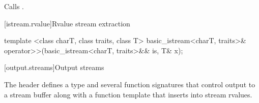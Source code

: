 \begin{itemdescr}
\pnum
\effects Calls .
\end{itemdescr}

[istream.rvalue]{Rvalue stream extraction}

%
%
\begin{itemdecl}
template <class charT, class traits, class T>
  basic_istream<charT, traits>&
  operator>>(basic_istream<charT, traits>&& is, T& x);
\end{itemdecl}

\begin{itemdescr}
\pnum
\effects {}

\pnum
\returns {}
\end{itemdescr}


[output.streams]{Output streams}

\pnum
The header
defines a type
and several function signatures that control output to a
stream buffer along with a function template that inserts into stream rvalues.


